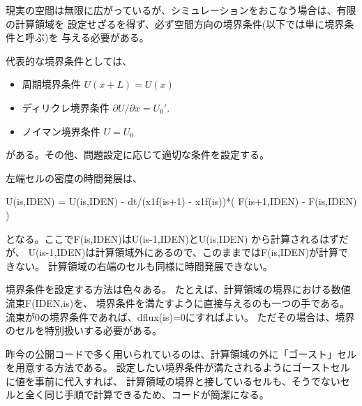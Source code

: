 現実の空間は無限に広がっているが、シミュレーションをおこなう場合は、有限の計算領域を
設定せざるを得ず、必ず空間方向の境界条件(以下では単に境界条件と呼ぶ)を
与える必要がある。

代表的な境界条件としては、
\begin{itemize}
    \item 周期境界条件 $U(x+L) = U(x)$

    \item ディリクレ境界条件 $\partial U/\partial x=U_0'$.

    \item ノイマン境界条件 $U=U_0$
\end{itemize}
がある。その他、問題設定に応じて適切な条件を設定する。

左端セルの密度の時間発展は、
\begin{screen}
{\ttfamily
\small
  U(is,IDEN) = U(is,IDEN) - dt/(x1f(is+1) - x1f(is))*( F(is+1,IDEN) - F(is,IDEN) )
}
\end{screen}
となる。ここで{\ttfamily F(is,IDEN)}は{\ttfamily U(is-1,IDEN)}と{\ttfamily U(is,IDEN)}
から計算されるはずだが、
{\ttfamily U(is-1,IDEN)}は計算領域外にあるので、このままでは{\ttfamily F(is,IDEN)}が計算できない。
計算領域の右端のセルも同様に時間発展できない。

境界条件を設定する方法は色々ある。
たとえば、計算領域の境界における数値流束{\ttfamily F(IDEN,is)}を、
境界条件を満たすように直接与えるのも一つの手である。
流束が0の境界条件であれば、{\ttfamily dflux(is)=0}にすればよい。
ただその場合は、境界のセルを特別扱いする必要がある。

昨今の公開コードで多く用いられているのは、計算領域の外に「ゴースト」セルを用意する方法である。
設定したい境界条件が満たされるようにゴーストセルに値を事前に代入すれば、
計算領域の境界と接しているセルも、そうでないセルと全く同じ手順で計算できるため、コードが簡潔になる。

